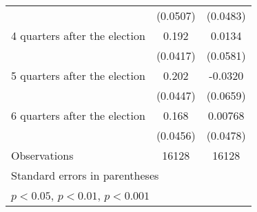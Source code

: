 \begin{table}[htbp]
\begin{tabular}{l*{2}{c}}
                    &    (0.0507)         &    (0.0483)         \\
[1em]
 4 quarters after the election&       0.192\sym{***}&      0.0134         \\
                    &    (0.0417)         &    (0.0581)         \\
[1em]
 5 quarters after the election&       0.202\sym{***}&     -0.0320         \\
                    &    (0.0447)         &    (0.0659)         \\
[1em]
 6 quarters after the election&       0.168\sym{***}&     0.00768         \\
                    &    (0.0456)         &    (0.0478)         \\
\hline
Observations        &       16128         &       16128         \\
\hline\hline
\multicolumn{3}{l}{\footnotesize Standard errors in parentheses}\\
\multicolumn{3}{l}{\footnotesize \sym{*} \(p<0.05\), \sym{**} \(p<0.01\), \sym{***} \(p<0.001\)}\\
\end{tabular}
\end{table}
